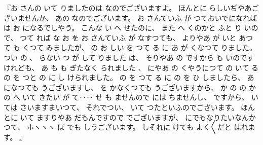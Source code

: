 %
『お
さんの
いて
りましたのは
なのでございますよ。
%
ほんとに
らしいぢやあございませんか、
%
あの
なのでございます。
%
お
さんていふ
が
つておいでになれば
は
お
になるでしやう。
%
こんな
い
へ
せたのに、
%
また
へ
くのかと
ふと
り
いので、
%
つて
れば
な
お
を
お
さんていふ
が
なすつても、
%
よりやあ
が
いと
あつて
も
くつて
みましたが、
%
の
お
しい
を
つて
る
に
あ
が
くなつて
りました。
%
つい
の
、
%
らない
つ
が
して
りました
は、
%
そりやあ
の
ですから
も
いのですけれども、
%
あ
も
も
ぎたなく
られました
、
%
にやあ
の
くやうにつて
の
いて
る
の
を
つと%
の
に
し
けられました。
%
の
を
つて
る
に
の
を
ひ
しましたら、
%
あ
になつても
うございますし、
%
を
かなくつても
うございますから、
%
か
の
の
かの
へ
いて
きたい
が
て‥‥
せ
も
ませんので
には
ちませんし、
%
ですから、
%
いては
さいますまいつて、
%
それでつい、
%
いて
つたといふのでございます。
%
ほんとに
いて
ますりやあ
だもんですので
でございますが、%
%
にでもなりたいなんかつて、
%
ホヽヽヽ
ぼ
でも
しうございます。
%
しそれに
けても
よく〳〵だと
はれます。
』

